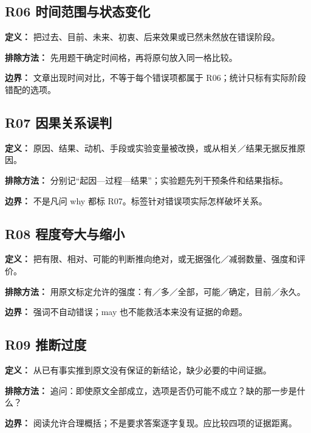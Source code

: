 \documentclass[11pt,a4paper]{article}
\begin{document}
\subsection{R06 时间范围与状态变化}\label{cat-R06}
\noindent\textbf{定义：} 把过去、目前、未来、初衷、后来效果或已然未然放在错误阶段。\par\smallskip
\noindent\textbf{排除方法：} 先用题干确定时间格，再将原句放入同一格比较。\par\smallskip
\noindent\textbf{边界：} 文章出现时间对比，不等于每个错误项都属于 R06；统计只标有实际阶段错配的选项。\par\smallskip
{}
\subsection{R07 因果关系误判}\label{cat-R07}
\noindent\textbf{定义：} 原因、结果、动机、手段或实验变量被改换，或从相关／结果无据反推原因。\par\smallskip
\noindent\textbf{排除方法：} 分别记“起因—过程—结果”；实验题先列干预条件和结果指标。\par\smallskip
\noindent\textbf{边界：} 不是凡问 why 都标 R07。标签针对错误项实际怎样破坏关系。\par\smallskip
{}
\subsection{R08 程度夸大与缩小}\label{cat-R08}
\noindent\textbf{定义：} 把有限、相对、可能的判断推向绝对，或无据强化／减弱数量、强度和评价。\par\smallskip
\noindent\textbf{排除方法：} 用原文标定允许的强度：有／多／全部，可能／确定，目前／永久。\par\smallskip
\noindent\textbf{边界：} 强词不自动错误；may 也不能救活本来没有证据的命题。\par\smallskip
{}
\subsection{R09 推断过度}\label{cat-R09}
\noindent\textbf{定义：} 从已有事实推到原文没有保证的新结论，缺少必要的中间证据。\par\smallskip
\noindent\textbf{排除方法：} 追问：即使原文全部成立，选项是否仍可能不成立？缺的那一步是什么？\par\smallskip
\noindent\textbf{边界：} 阅读允许合理概括；不是要求答案逐字复现。应比较四项的证据距离。\par\smallskip
{}
\end{document}
